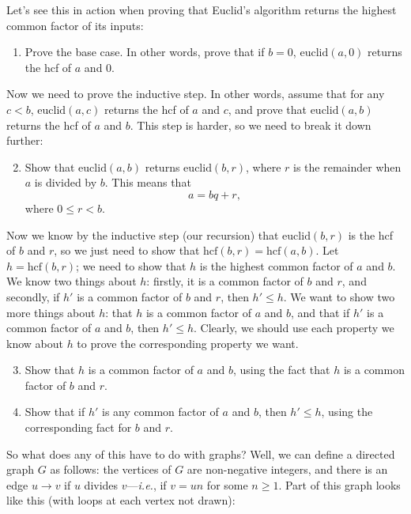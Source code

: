\documentclass{article}
\begin{document}
Let's see this in action when proving that Euclid's algorithm returns the highest common factor of its inputs:

\begin{enumerate}
	\item Prove the base case. In other words, prove that if $b=0$, $\mathrm{euclid}(a, 0)$ returns the hcf of $a$ and 0.
\end{enumerate}

Now we need to prove the inductive step. In other words, assume that for any $c<b$, $\mathrm{euclid}(a,c)$ returns the hcf of $a$ and $c$, and prove that $\mathrm{euclid}(a,b)$ returns the hcf of $a$ and $b$. This step is harder, so we need to break it down further:

\begin{enumerate}\setcounter{enumi}{1}
	\item Show that $\mathrm{euclid}(a,b)$ returns $\mathrm{euclid}(b,r)$, where $r$ is the remainder when $a$ is divided by $b$. This means that
		\[a=bq+r,\]
		where $0\leq r < b$.
\end{enumerate}

Now we know by the inductive step (our recursion) that $\mathrm{euclid}(b,r)$ is the hcf of $b$ and $r$, so we just need to show that $\mathrm{hcf}(b,r)=\mathrm{hcf}(a,b)$. Let $h=\mathrm{hcf}(b,r)$; we need to show that $h$ is the highest common factor of $a$ and $b$. We know two things about $h$: firstly, it is a common factor of $b$ and $r$, and secondly, if $h'$ is a common factor of $b$ and $r$, then $h'\leq h$. We want to show two more things about $h$: that $h$ is a common factor of $a$ and $b$, and that if $h'$ is a common factor of $a$ and $b$, then $h'\leq h$. Clearly, we should use each property we know about $h$ to prove the corresponding property we want.

\begin{enumerate}\setcounter{enumi}{2}
	\item Show that $h$ is a common factor of $a$ and $b$, using the fact that $h$ is a common factor of $b$ and $r$.
	\item Show that if $h'$ is any common factor of $a$ and $b$, then $h'\leq h$, using the corresponding fact for $b$ and $r$.
\end{enumerate}

\bigskip

So what does any of this have to do with graphs? Well, we can define a directed graph $G$ as follows: the vertices of $G$ are non-negative integers, and there is an edge $u\to v$ if $u$ divides $v$---\textit{i.e.}, if $v=un$ for some $n\geq 1$. Part of this graph looks like this (with loops at each vertex not drawn):
\begin{center}
\end{center}
\end{document}
